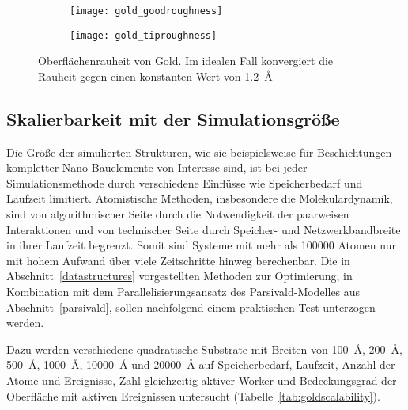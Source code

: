\begin{figure}
  \captionsetup[subfigure]{singlelinecheck=false}
  \def\subfigwidth{0.49\textwidth}

  \begin{subfigure}[t]{\subfigwidth}
    \texttt{[image: gold\_goodroughness]}
    \label{fig:goldroughness-a}
  \end{subfigure}
  \hfill
  \begin{subfigure}[t]{\subfigwidth}
    \texttt{[image: gold\_tiproughness]}
    \label{fig:goldroughness-b}
  \end{subfigure}

  \caption[Oberflächenrauheit von Gold]{Oberflächenrauheit von Gold.
    Im idealen Fall konvergiert die Rauheit gegen einen konstanten Wert von \SI{1.2}{\angstrom}
  }
  \label{fig:goldroughness}

\end{figure}

\subsection{Skalierbarkeit mit der Simulationsgröße}
\label{goldscalability}

Die Größe der simulierten Strukturen, wie sie beispielsweise für Beschichtungen kompletter Nano-Bauelemente von Interesse sind, ist bei jeder Simulationsmethode durch verschiedene Einflüsse wie Speicherbedarf und Laufzeit limitiert.
Atomistische Methoden, insbesondere die Molekulardynamik, sind von algorithmischer Seite durch die Notwendigkeit der paarweisen Interaktionen und von technischer Seite durch Speicher- und Netzwerkbandbreite in ihrer Laufzeit begrenzt.
Somit sind Systeme mit mehr als \num{100000} Atomen nur mit hohem Aufwand über viele Zeitschritte hinweg berechenbar.
Die in Abschnitt~\ref{datastructures} vorgestellten Methoden zur Optimierung, in Kombination mit dem Parallelisierungsansatz des Parsivald-Modelles aus Abschnitt~\ref{parsivald}, sollen nachfolgend einem praktischen Test unterzogen werden.

Dazu werden verschiedene quadratische Substrate mit Breiten von \SI{100}{\angstrom}, \SI{200}{\angstrom}, \SI{500}{\angstrom}, \SI{1000}{\angstrom}, \SI{10000}{\angstrom} und \SI{20000}{\angstrom} auf Speicherbedarf, Laufzeit, Anzahl der Atome und Ereignisse, Zahl gleichzeitig aktiver Worker und Bedeckungsgrad der Oberfläche mit aktiven Ereignissen untersucht (Tabelle~\ref{tab:goldscalability}).

